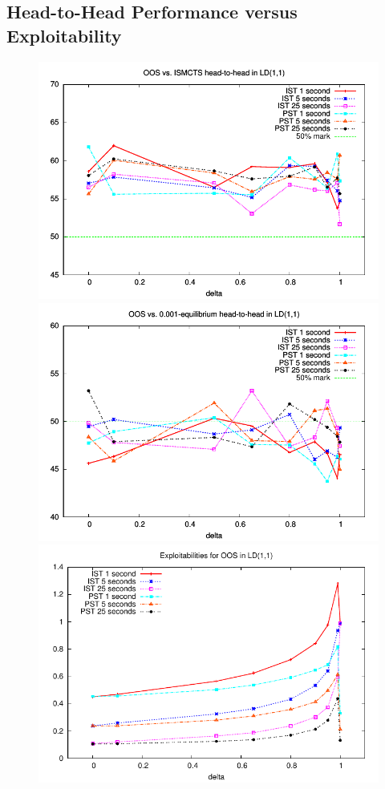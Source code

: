 \documentclass[letterpaper]{article}
\begin{document}
\subsection{Head-to-Head Performance versus Exploitability} 

\begin{figure}[t!]
\begin{center}
\includegraphics[scale=0.55]{plots/ismcts-oos-perf} \\
\includegraphics[scale=0.55]{plots/eq-oos-perf} \\
\includegraphics[scale=0.55]{plots/oos-expl} \\

\end{center}
\end{figure}
\end{document}
